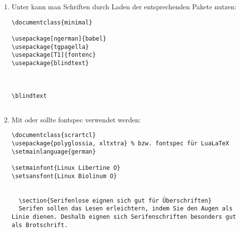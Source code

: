 % 


\begin{enumerate}[label=\alph*)]
		\item Unter  kann man Schriften durch Laden der entsprechenden Pakete nutzen:

\begin{lstlisting}
\documentclass{minimal}

\usepackage[ngerman]{babel}
\usepackage{tgpagella}
\usepackage[T1]{fontenc}
\usepackage{blindtext}



\blindtext


\end{lstlisting}


		\item Mit  oder  sollte fontspec verwendet werden: 

\begin{lstlisting}
\documentclass{scrartcl}
\usepackage{polyglossia, xltxtra} % bzw. fontspec für LuaLaTeX
\setmainlanguage{german}

\setmainfont{Linux Libertine O}
\setsansfont{Linux Biolinum O}


  \section{Serifenlose eignen sich gut für Überschriften}
  Serifen sollen das Lesen erleichtern, indem Sie den Augen als Linie dienen. Deshalb eignen sich Serifenschriften besonders gut als Brotschrift.

\end{lstlisting}

\end{enumerate}


